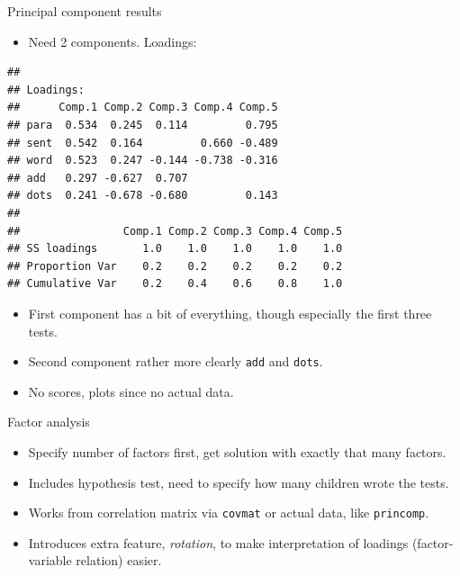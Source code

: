 \documentclass[ignorenonframetext,]{beamer}
\newenvironment{Shaded}{\begin{snugshade}}{\end{snugshade}}
\newcommand{\NormalTok}[1]{#1}
\newcommand{\OperatorTok}[1]{\textcolor[rgb]{0.81,0.36,0.00}{\textbf{#1}}}
\providecommand{\tightlist}{%
  \setlength{\itemsep}{0pt}\setlength{\parskip}{0pt}}
\begin{document}
\begin{frame}[fragile]{Principal component results}
\protect\hypertarget{principal-component-results}{}

\begin{itemize}
\tightlist
\item
  Need 2 components. Loadings:
\end{itemize}

\begin{Shaded}
\end{Shaded}

\begin{verbatim}
## 
## Loadings:
##      Comp.1 Comp.2 Comp.3 Comp.4 Comp.5
## para  0.534  0.245  0.114         0.795
## sent  0.542  0.164         0.660 -0.489
## word  0.523  0.247 -0.144 -0.738 -0.316
## add   0.297 -0.627  0.707              
## dots  0.241 -0.678 -0.680         0.143
## 
##                Comp.1 Comp.2 Comp.3 Comp.4 Comp.5
## SS loadings       1.0    1.0    1.0    1.0    1.0
## Proportion Var    0.2    0.2    0.2    0.2    0.2
## Cumulative Var    0.2    0.4    0.6    0.8    1.0
\end{verbatim}

\begin{itemize}
\item
  First component has a bit of everything, though especially the first
  three tests.
\item
  Second component rather more clearly \texttt{add} and \texttt{dots}.
\item
  No scores, plots since no actual data.
\end{itemize}

\end{frame}

\begin{frame}[fragile]{Factor analysis}
\protect\hypertarget{factor-analysis}{}

\begin{itemize}
\item
  Specify number of factors first, get solution with exactly that many
  factors.
\item
  Includes hypothesis test, need to specify how many children wrote the
  tests.
\item
  Works from correlation matrix via \texttt{covmat} or actual data, like
  \texttt{princomp}.
\item
  Introduces extra feature, \emph{rotation}, to make interpretation of
  loadings (factor-variable relation) easier.
\end{itemize}

\end{frame}
\end{document}
